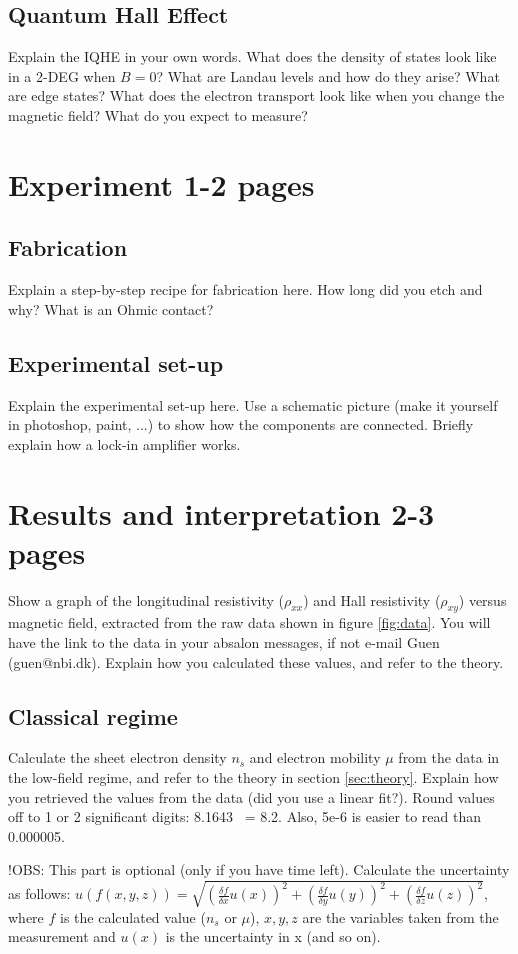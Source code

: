 \documentclass[a4paper]{article}
\begin{document}
\subsection{Quantum Hall Effect}
Explain the IQHE in your own words. What does the density of states look like in a 2-DEG when $B=0$? What are Landau levels and how do they arise? What are edge states? What does the electron transport look like when you change the magnetic field? What do you expect to measure?

\section{Experiment 1-2 pages}
\subsection{Fabrication}
Explain a step-by-step recipe for fabrication here. How long did you etch and why? What is an Ohmic contact?
\subsection{Experimental set-up}
Explain the experimental set-up here. Use a schematic picture (make it yourself in photoshop, paint, ...) to show how the components are connected. Briefly explain how a lock-in amplifier works.

\section{Results and interpretation 2-3 pages}
Show a graph of the longitudinal resistivity ($\rho_{xx}$) and Hall resistivity ($\rho_{xy}$) versus magnetic field, extracted from the raw data shown in figure \ref{fig:data}. You will have the link to the data in your absalon messages, if not e-mail Guen (guen@nbi.dk). Explain how you calculated these values, and refer to the theory.

\subsection{Classical regime}
Calculate the sheet electron density $n_{s}$ and electron mobility $\mu$ from the data in the low-field regime, and refer to the theory in section \ref{sec:theory}. Explain how you retrieved the values from the data (did you use a linear fit?).
Round values off to 1 or 2 significant digits: 8.1643 ~= 8.2. Also, 5e-6 is easier to read than 0.000005.

!OBS: This part is optional (only if you have time left).
Calculate the uncertainty as follows: \newline $u(f(x, y, z)) = \sqrt{(\frac{\delta f}{\delta{x}} u(x))^{2} + (\frac{\delta f}{\delta{y}} u(y))^{2} + (\frac{\delta f}{\delta{z}} u(z))^{2}}$, where $f$ is the calculated value ($n_{s}$ or $\mu$), $x, y, z$ are the variables taken from the measurement and $u(x)$ is the uncertainty in x (and so on).
\end{document}
